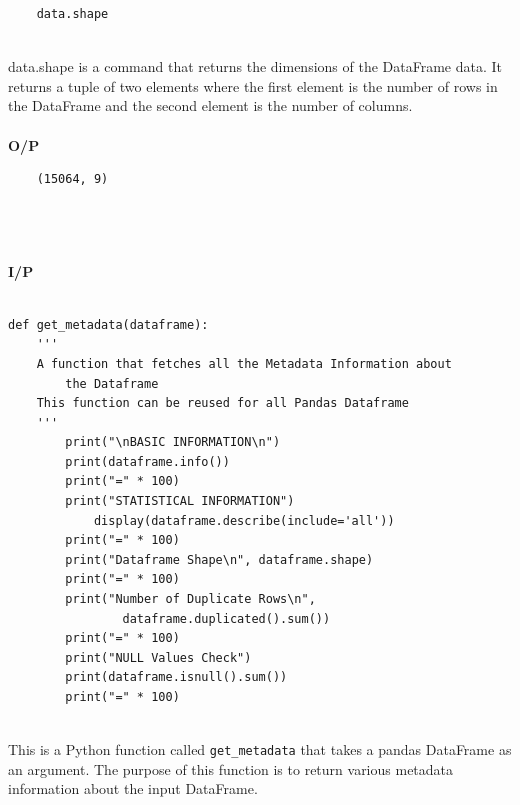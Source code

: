 \begin{verbatim}
    data.shape 
\end{verbatim}
\\
data.shape is a command that returns the dimensions of the DataFrame data. 
It returns a tuple of two elements where the first element is the number of rows in the DataFrame and the second element is the number of columns. 
\\
\\
\noindent
\textbf{O/P} \\[-1.5em] %
\begin{verbatim}
    (15064, 9)
\end{verbatim}
\\
\\
\\
\noindent
\textbf{I/P} \\[-2.5em] %
\\
\begin{verbatim}
def get_metadata(dataframe): 
    ''' 
    A function that fetches all the Metadata Information about
        the Dataframe 
    This function can be reused for all Pandas Dataframe 
    ''' 
        print("\nBASIC INFORMATION\n") 
        print(dataframe.info()) 
        print("=" * 100) 
        print("STATISTICAL INFORMATION") 
            display(dataframe.describe(include='all')) 
        print("=" * 100) 
        print("Dataframe Shape\n", dataframe.shape) 
        print("=" * 100) 
        print("Number of Duplicate Rows\n",
                dataframe.duplicated().sum()) 
        print("=" * 100) 
        print("NULL Values Check") 
        print(dataframe.isnull().sum()) 
        print("=" * 100) 
\end{verbatim}
\\
\noindent
This is a Python function called \texttt{get\_metadata} that takes a pandas DataFrame as an argument. 
The purpose of this function is to return various metadata information about the input DataFrame.

